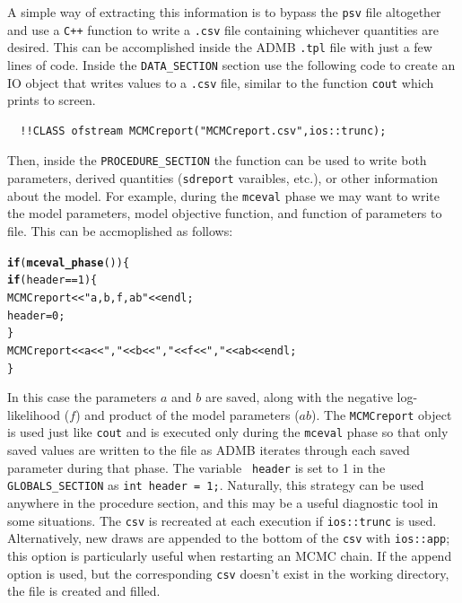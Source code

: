 \documentclass{article}\usepackage[]{graphicx}\usepackage[]{color}
\makeatletter
\newcommand{\hlstr}[1]{\textcolor[rgb]{0.192,0.494,0.8}{#1}}%
\newcommand{\hlkwd}[1]{\textcolor[rgb]{0.737,0.353,0.396}{\textbf{#1}}}%
\newenvironment{kframe}{%
 \def\at@end@of@kframe{}%
 \ifinner\ifhmode%
  \def\at@end@of@kframe{\end{minipage}}%
  \begin{minipage}{\columnwidth}%
 \fi\fi%
 \def\FrameCommand##1{\hskip\@totalleftmargin \hskip-\fboxsep
 \colorbox{shadecolor}{##1}\hskip-\fboxsep
     \hskip-\linewidth \hskip-\@totalleftmargin \hskip\columnwidth}%
 \MakeFramed {\advance\hsize-\width
   \@totalleftmargin\z@ \linewidth\hsize
   \@setminipage}}%
 {\par\unskip\endMakeFramed%
 \at@end@of@kframe}
\newenvironment{knitrout}{}{} %
\makeatother
\begin{document}
A simple way of extracting this information is to bypass the
\texttt{psv} file altogether and use a \texttt{C++} function
to write a \texttt{.csv} file containing whichever quantities
are desired. This can be accomplished inside the ADMB
\texttt{.tpl} file with just a few lines of code. Inside the
\texttt{DATA\_SECTION} section use the following code to
create an IO object that writes values to a \texttt{.csv}
file, similar to the function \texttt{cout} which prints to
screen.
\begin{verbatim}
  !!CLASS ofstream MCMCreport("MCMCreport.csv",ios::trunc);
\end{verbatim}
Then, inside the \texttt{PROCEDURE\_SECTION} the function can be used to
write both parameters, derived quantities (\texttt{sdreport} varaibles,
etc.), or other information about the model. For example, during the
\texttt{mceval} phase we may want to write the model parameters, model
objective function, and function of parameters to file. This can be
accmoplished as follows:
\begin{knitrout}
\color{fgcolor}\begin{kframe}
\begin{alltt}
  \hlkwd{if}(\hlkwd{mceval_phase}())\{
    \hlkwd{if}(header==1) \{
        MCMCreport << \hlstr{"a,b,f,ab"} << endl;
        header=0;
    \}
    MCMCreport << a <<\hlstr{","} << b << \hlstr{","} << f << \hlstr{","} << ab << endl;
  \}
\end{alltt}
\end{kframe}
\end{knitrout}


In this case the parameters $a$ and $b$ are saved, along with the negative
log-likelihood ($f$) and product of the model parameters ($ab$).  The
\texttt{MCMCreport} object is used just like \texttt{cout} and is executed
only during the \texttt{mceval} phase so that only saved values are written
to the file as ADMB iterates through each saved parameter during that
phase. The variable \texttt{ header} is set to 1 in the
\texttt{GLOBALS\_SECTION} as \texttt{int header = 1;}. Naturally, this strategy
can be used anywhere in the procedure section, and this may be a useful
diagnostic tool in some situations. The \texttt{csv} is recreated at each
execution if \texttt{ios::trunc} is used. Alternatively, new draws are
appended to the bottom of the \texttt{csv} with \texttt{ios::app}; this
option is particularly useful when restarting an MCMC chain. If the append
option is used, but the corresponding \texttt{csv} doesn't exist in the
working directory, the file is created and filled.
\end{document}
